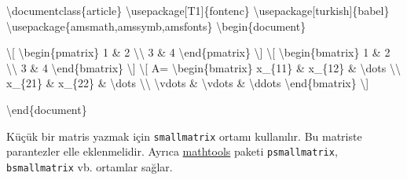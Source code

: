 \documentclass[
  letterpaper,
  DIV=11,
  numbers=noendperiod]{scrreprt}
\newenvironment{Shaded}{\begin{snugshade}}{\end{snugshade}}
\newcommand{\BuiltInTok}[1]{\textcolor[rgb]{0.00,0.23,0.31}{#1}}
\newcommand{\ExtensionTok}[1]{\textcolor[rgb]{0.00,0.23,0.31}{#1}}
\newcommand{\KeywordTok}[1]{\textcolor[rgb]{0.00,0.23,0.31}{#1}}
\newcommand{\NormalTok}[1]{\textcolor[rgb]{0.00,0.23,0.31}{#1}}
\newcommand{\SpecialCharTok}[1]{\textcolor[rgb]{0.37,0.37,0.37}{#1}}
\newcommand{\SpecialStringTok}[1]{\textcolor[rgb]{0.13,0.47,0.30}{#1}}
\begin{document}
\begin{Shaded}
\begin{Highlighting}[]
\BuiltInTok{\textbackslash{}documentclass}\NormalTok{\{}\ExtensionTok{article}\NormalTok{\}}
\BuiltInTok{\textbackslash{}usepackage}\NormalTok{[T1]\{}\ExtensionTok{fontenc}\NormalTok{\}}
\BuiltInTok{\textbackslash{}usepackage}\NormalTok{[turkish]\{}\ExtensionTok{babel}\NormalTok{\}}
\BuiltInTok{\textbackslash{}usepackage}\NormalTok{\{}\ExtensionTok{amsmath,amssymb,amsfonts}\NormalTok{\}}
\KeywordTok{\textbackslash{}begin}\NormalTok{\{}\ExtensionTok{document}\NormalTok{\}}

\SpecialStringTok{\textbackslash{}[}
\KeywordTok{\textbackslash{}begin}\NormalTok{\{}\ExtensionTok{pmatrix}\NormalTok{\}}
\SpecialStringTok{1 \& 2 }\SpecialCharTok{\textbackslash{}\textbackslash{}}
\SpecialStringTok{3 \& 4}
\KeywordTok{\textbackslash{}end}\NormalTok{\{}\ExtensionTok{pmatrix}\NormalTok{\}}
\SpecialStringTok{\textbackslash{}]}
\SpecialStringTok{\textbackslash{}[}
\KeywordTok{\textbackslash{}begin}\NormalTok{\{}\ExtensionTok{bmatrix}\NormalTok{\}}
\SpecialStringTok{1 \& 2 }\SpecialCharTok{\textbackslash{}\textbackslash{}}
\SpecialStringTok{3 \& 4}
\KeywordTok{\textbackslash{}end}\NormalTok{\{}\ExtensionTok{bmatrix}\NormalTok{\}}
\SpecialStringTok{\textbackslash{}]}
\SpecialStringTok{\textbackslash{}[}
\SpecialStringTok{A=}
\KeywordTok{\textbackslash{}begin}\NormalTok{\{}\ExtensionTok{bmatrix}\NormalTok{\}}
\SpecialStringTok{x\_\{11\} \& x\_\{12\} \& }\SpecialCharTok{\textbackslash{}dots}\SpecialStringTok{ }\SpecialCharTok{\textbackslash{}\textbackslash{}}
\SpecialStringTok{x\_\{21\} \& x\_\{22\} \& }\SpecialCharTok{\textbackslash{}dots}\SpecialStringTok{ }\SpecialCharTok{\textbackslash{}\textbackslash{}}
\SpecialCharTok{\textbackslash{}vdots}\SpecialStringTok{ \& }\SpecialCharTok{\textbackslash{}vdots}\SpecialStringTok{ \& }\SpecialCharTok{\textbackslash{}ddots}
\KeywordTok{\textbackslash{}end}\NormalTok{\{}\ExtensionTok{bmatrix}\NormalTok{\}}
\SpecialStringTok{\textbackslash{}]}

\KeywordTok{\textbackslash{}end}\NormalTok{\{}\ExtensionTok{document}\NormalTok{\}}
\end{Highlighting}
\end{Shaded}

Küçük bir matris yazmak için \texttt{smallmatrix} ortamı kullanılır. Bu
matriste parantezler elle eklenmelidir. Ayrıca
\href{https://ftp.cc.uoc.gr/mirrors/CTAN/macros/latex/contrib/mathtools/mathtools.pdf}{mathtools}
paketi \texttt{psmallmatrix}, \texttt{bsmallmatrix} vb. ortamlar sağlar.
\end{document}
